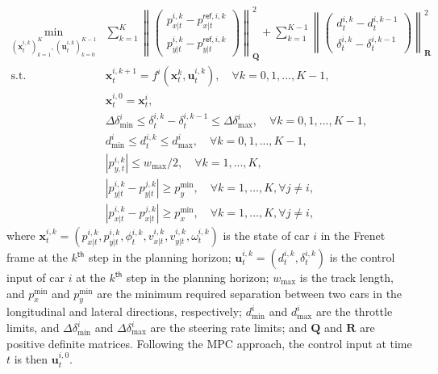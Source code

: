 \begin{subequations} \label{eqn:opt}  
\begin{align}
\min_{(\textbf{x}_t^{i,k})_{k=1}^{K},(\textbf{u}_t^{i,k})_{k=0}^{K-1}} &\sum_{k=1}^K \left\| \begin{pmatrix} p_{x|t}^{i,k} - p_{x|t}^{\textsf{ref},i,k} \\ p_{y|t}^{i,k} - p_{y|t}^{\textsf{ref},i,k} \end{pmatrix} \right\|_{\textbf{Q}}^2 
+ \sum_{k=1}^{K-1} \left\| \begin{pmatrix} d_t^{i,k} - d_t^{i,k-1} \\ \delta_t^{i,k} - \delta_t^{i,k-1} \end{pmatrix} \right\|_{\textbf{R}}^2  \label{eq: MPCObjective}\\
\text{s.t.  } &\mathbf{x}_{t}^{i,k+1} = f^i (\mathbf{x}_t^{k},\mathbf{u}_t^{i,k}), \quad \forall k = 0,1,..., K-1,  \label{eq: MPCDynamics}\\
\text{           } &\mathbf{x}_t^{i,0} = \mathbf{x}_t^i, \label{eq: MPCInitialCondition}\\
\text{           } &\Delta \delta_{\min}^i \le \delta_t^{i,k} - \delta_t^{i,k-1} \le \Delta \delta_{\max}^i, \quad \forall k = 0,1,..., K-1, \label{eq: MPCControlConstraints}\\
&d_{\min}^i \le d_t^{i,k} \le d_{\max}^i, \quad \forall k = 0,1,..., K-1, \label{eq: MPCThrottleConstraints}\\
& |p_{y,t}^{i,k}| \leq w_{\max}/2, \quad \forall k = 1,..., K, \label{eq: MPCStateConstraintTrack}\\
& |p_{y|t}^{i,k} - p_{y|t}^{j,k}| \geq p_y^{\min}, \quad \forall k = 1,..., K, \forall j \neq i, \label{eq: MPCLateralCollisionAvoidance}\\
& |p_{x|t}^{i,k} - p_{x|t}^{j,k}| \geq p_x^{\min}, \quad \forall k = 1,..., K, \forall j \neq i, \label{eq: MPCLongitudinalCollisionAvoidance} 
\end{align}
\end{subequations}
where \(\mathbf{x}_t^{i,k} = (p_{x|t}^{i,k}, p_{y|t}^{i,k}, \phi_{t}^{i,k}, v_{x|t}^{i,k}, v_{y|t}^{i,k}, \omega_t^{i,k})\) is the state of car \(i\) in the Frenet frame at the \(k^{\textsf{th}}\) step in the planning horizon; \(\mathbf{u}_t^{i,k} = (d_t^{i,k}, \delta_{t}^{i,k})\) is the control input of car \(i\) at the \(k^{\textsf{th}}\) step in the planning horizon; \(w_{\max}\) is the track length, and \(p_x^{\min}\) and \(p_y^{\min}\) are the minimum required separation between two cars in the longitudinal and lateral directions, respectively; \(d_{\min}^i\) and \(d_{\max}^i\) are the throttle limits, and \(\Delta \delta_{\min}^i\) and \(\Delta \delta_{\max}^i\) are the steering rate limits; and $\textbf{Q}$ and $\textbf{R}$ are positive definite matrices. Following the MPC approach, the control input at time \(t\) is then \(\mathbf{u}_t^{i,0}\).

